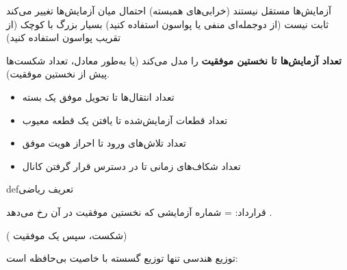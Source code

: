 
\lr{\mbox{\PSno{}}} آزمایش‌ها مستقل نیستند (خرابی‌های همبسته)\PSbr{}\lr{\mbox{\PSno{}}} احتمال میان آزمایش‌ها تغییر می‌کند\PSbr{} ثابت نیست (از دوجمله‌ای منفی یا پواسون استفاده کنید)\PSbr{} بسیار بزرگ با  کوچک (از تقریب پواسون استفاده کنید)



\textbf{تعداد آزمایش‌ها تا نخستین موفقیت} را مدل می‌کند (یا به‌طور معادل، تعداد شکست‌ها پیش از نخستین موفقیت).


\begin{itemize}
\tightlist
\item
  تعداد انتقال‌ها تا تحویل موفق یک بسته
\item
  تعداد قطعات آزمایش‌شده تا یافتن یک قطعه معیوب
\item
  تعداد تلاش‌های ورود تا احراز هویت موفق
\item
  تعداد شکاف‌های زمانی تا در دسترس قرار گرفتن کانال
\end{itemize}

\begin{PSbox}[unbreakable]{def}{تعریف ریاضی}


قرارداد:  = شماره آزمایشی که نخستین موفقیت در آن رخ می‌دهد .

\end{PSbox}



( شکست، سپس یک موفقیت)








توزیع هندسی تنها توزیع گسسته با خاصیت بی‌حافظه است:

